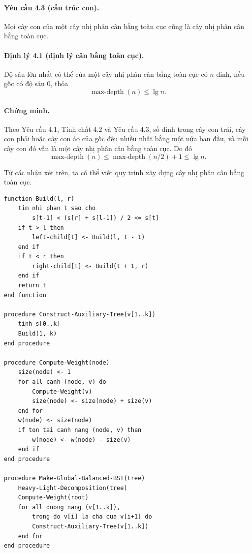 \documentclass[11pt]{article}
\begin{document}
\paragraph{Yêu cầu 4.3 (cấu trúc con).}
Mọi cây con của một cây nhị phân cân bằng toàn cục cũng là cây nhị phân cân
bằng toàn cục.

\paragraph{Định lý 4.1 (định lý cân bằng toàn cục).}
Độ sâu lớn nhất có thể của một cây nhị phân cân bằng toàn cục có $n$ đỉnh, nếu
gốc có độ sâu $0$, thỏa
\[
  \operatorname{max\mbox{-}depth}(n)\le \lg n.
\]

\paragraph{Chứng minh.}
Theo Yêu cầu 4.1, Tính chất 4.2 và Yêu cầu 4.3, số đỉnh trong cây con trái,
cây con phải hoặc cây con ảo của gốc đều nhiều nhất bằng một nửa ban đầu, và
mỗi cây con đó vẫn là một cây nhị phân cân bằng toàn cục. Do đó
\[
  \operatorname{max\mbox{-}depth}(n)
  \le \operatorname{max\mbox{-}depth}(n/2)+1
  \le \lg n.
\]

Từ các nhận xét trên, ta có thể viết quy trình xây dựng cây nhị phân cân bằng
toàn cục.

\begingroup
\small
\begin{verbatim}
function Build(l, r)
    tim nhi phan t sao cho
        s[t-1] < (s[r] + s[l-1]) / 2 <= s[t]
    if t > l then
        left-child[t] <- Build(l, t - 1)
    end if
    if t < r then
        right-child[t] <- Build(t + 1, r)
    end if
    return t
end function

procedure Construct-Auxiliary-Tree(v[1..k])
    tinh s[0..k]
    Build(1, k)
end procedure

procedure Compute-Weight(node)
    size(node) <- 1
    for all canh (node, v) do
        Compute-Weight(v)
        size(node) <- size(node) + size(v)
    end for
    w(node) <- size(node)
    if ton tai canh nang (node, v) then
        w(node) <- w(node) - size(v)
    end if
end procedure

procedure Make-Global-Balanced-BST(tree)
    Heavy-Light-Decomposition(tree)
    Compute-Weight(root)
    for all duong nang (v[1..k]),
        trong do v[i] la cha cua v[i+1] do
        Construct-Auxiliary-Tree(v[1..k])
    end for
end procedure
\end{verbatim}
\endgroup
\end{document}
